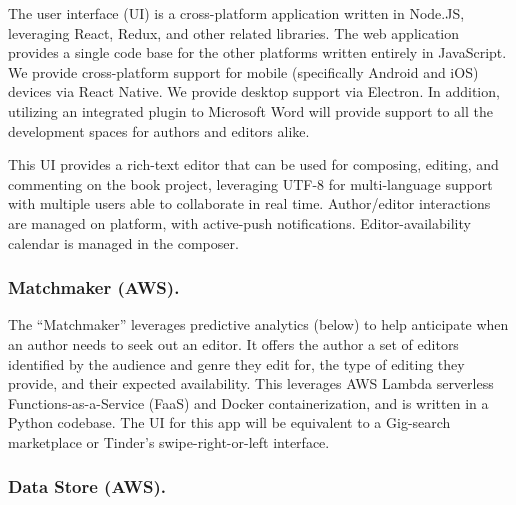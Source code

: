 \documentclass[10pt,openany]{book}
\begin{document}
The user interface (UI) is a cross-platform application written in
Node.JS, leveraging React, Redux, and other related libraries. The web
application provides a single code base for the other platforms written
entirely in JavaScript. We provide cross-platform support for mobile
(specifically Android and iOS) devices via React Native. We provide
desktop support via Electron. In addition, utilizing an integrated
plugin to Microsoft Word will provide support to all the development
spaces for authors and editors alike.

This UI provides a rich-text editor that can be used for composing,
editing, and commenting on the book project, leveraging UTF-8 for
multi-language support with multiple users able to collaborate in real
time. Author/editor interactions are managed on platform, with
active-push notifications. Editor-availability calendar is managed in
the composer.

\hypertarget{matchmaker-aws.}{%
\subsubsection{Matchmaker (AWS).}\label{matchmaker-aws.}}

The ``Matchmaker'' leverages predictive analytics (below) to help
anticipate when an author needs to seek out an editor. It offers the
author a set of editors identified by the audience and genre they edit
for, the type of editing they provide, and their expected availability.
This leverages AWS Lambda serverless Functions-as-a-Service (FaaS) and
Docker containerization, and is written in a Python codebase. The UI for
this app will be equivalent to a Gig-search marketplace or Tinder's
swipe-right-or-left interface.

\hypertarget{data-store-aws.}{%
\subsubsection{Data Store (AWS).}\label{data-store-aws.}}
\end{document}
